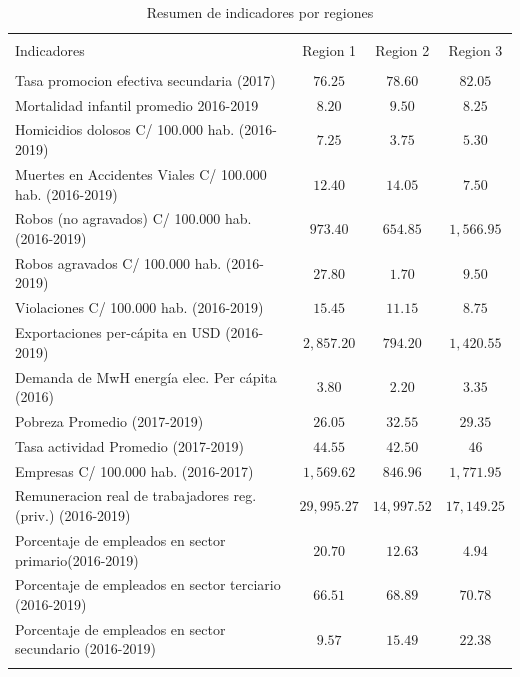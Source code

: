 \documentclass[12pt,a4paper]{article}
\begin{document}
\begin{table}[!htbp] 
\center
\footnotesize
\raggedleft
  \caption{\\Resumen de indicadores por regiones} 
  \label{cuadro:indicadores} 
\begin{tabular}{@{\extracolsep{5pt}} lccc} 
\\[-1.8ex]\hline 
\hline \\[-1.8ex] 
 Indicadores & Region 1 & Region 2 & Region 3 \\ 
\hline \\[-1.8ex] 
 Tasa promocion efectiva secundaria (2017) & $76.25$ & $78.60$ & $82.05$ \\ 
 Mortalidad infantil promedio 2016-2019 & $8.20$ & $9.50$ & $8.25$ \\ 
 Homicidios dolosos C/ 100.000 hab. (2016-2019) & $7.25$ & $3.75$ & $5.30$ \\ 
 Muertes en Accidentes Viales C/ 100.000  hab.  (2016-2019) & $12.40$ & $14.05$ & $7.50$ \\ 
 Robos (no agravados) C/ 100.000 hab. (2016-2019) & $973.40$ & $654.85$ & $1,566.95$ \\ 
 Robos agravados C/ 100.000 hab. (2016-2019) & $27.80$ & $1.70$ & $9.50$ \\ 
 Violaciones  C/ 100.000 hab. (2016-2019) & $15.45$ & $11.15$ & $8.75$ \\ 
 Exportaciones per-cápita en USD (2016-2019) & $2,857.20$ & $794.20$ & $1,420.55$ \\ 
 Demanda de MwH energía elec. Per cápita (2016) & $3.80$ & $2.20$ & $3.35$ \\ 
 Pobreza Promedio (2017-2019) & $26.05$ & $32.55$ & $29.35$ \\ 
 Tasa actividad Promedio (2017-2019) & $44.55$ & $42.50$ & $46$ \\ 
 Empresas  C/ 100.000 hab. (2016-2017) & $1,569.62$ & $846.96$ & $1,771.95$ \\ 
 Remuneracion  real de trabajadores reg. (priv.) (2016-2019) & $29,995.27$ & $14,997.52$ & $17,149.25$ \\ 
 Porcentaje de empleados en sector primario(2016-2019) & $20.70$ & $12.63$ & $4.94$ \\ 
 Porcentaje de empleados en sector terciario (2016-2019) & $66.51$ & $68.89$ & $70.78$ \\ 
 Porcentaje de empleados en sector secundario (2016-2019) & $9.57$ & $15.49$ & $22.38$ 
\\ 
\hline \\[-1.8ex] 

\end{tabular} 
\end{table} 
\end{document}
